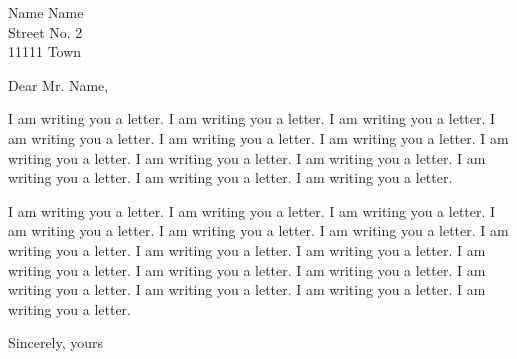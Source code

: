 \documentclass[addressstd,a4paper,10pt]{dinbrief}
\begin{document}
\begin{letter}{Name Name\\ %
               Street No. 2\\[\medskipamount]
               11111 Town}



\subject{\bf Subject of the letter}

\opening{Dear Mr. Name,}

I am writing you a letter. I am writing you a letter. I am writing you a letter. I am writing you a letter. I am writing you a letter. I am writing you a letter. I am writing you a letter. I am writing you a letter. I am writing you a letter. I am writing you a letter. I am writing you a letter. I am writing you a letter.

I am writing you a letter. I am writing you a letter. I am writing you a letter. I am writing you a letter. I am writing you a letter. I am writing you a letter. I am writing you a letter. I am writing you a letter. I am writing you a letter. I am writing you a letter. I am writing you a letter. I am writing you a letter. I am writing you a letter. I am writing you a letter. I am writing you a letter. I am writing you a letter.

\closing{Sincerely, yours}



\end{letter}


\end{document}
